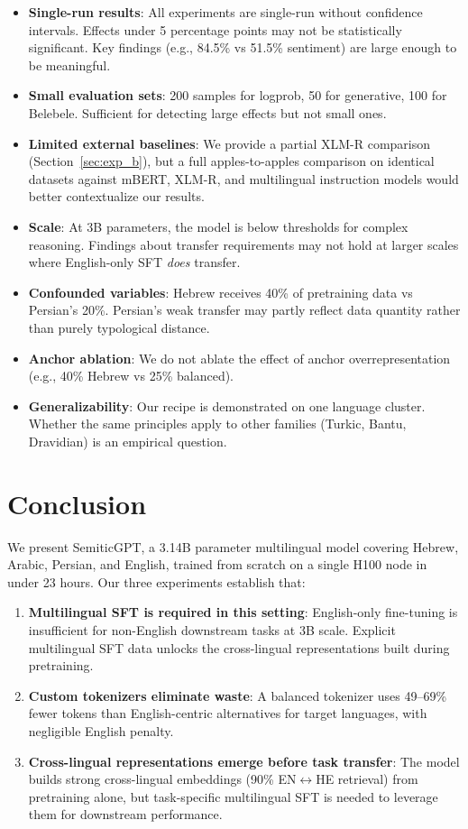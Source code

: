 \documentclass[10pt,twocolumn]{article}
\begin{document}
\begin{itemize}
    \item \textbf{Single-run results}: All experiments are single-run without confidence intervals. Effects under 5 percentage points may not be statistically significant. Key findings (e.g., 84.5\% vs 51.5\% sentiment) are large enough to be meaningful.
    \item \textbf{Small evaluation sets}: 200 samples for logprob, 50 for generative, 100 for Belebele. Sufficient for detecting large effects but not small ones.
    \item \textbf{Limited external baselines}: We provide a partial XLM-R comparison (Section~\ref{sec:exp_b}), but a full apples-to-apples comparison on identical datasets against mBERT, XLM-R, and multilingual instruction models would better contextualize our results.
    \item \textbf{Scale}: At 3B parameters, the model is below thresholds for complex reasoning. Findings about transfer requirements may not hold at larger scales where English-only SFT \emph{does} transfer.
    \item \textbf{Confounded variables}: Hebrew receives 40\% of pretraining data vs Persian's 20\%. Persian's weak transfer may partly reflect data quantity rather than purely typological distance.
    \item \textbf{Anchor ablation}: We do not ablate the effect of anchor overrepresentation (e.g., 40\% Hebrew vs 25\% balanced).
    \item \textbf{Generalizability}: Our recipe is demonstrated on one language cluster. Whether the same principles apply to other families (Turkic, Bantu, Dravidian) is an empirical question.
\end{itemize}

\section{Conclusion}

We present SemiticGPT, a 3.14B parameter multilingual model covering Hebrew, Arabic, Persian, and English, trained from scratch on a single H100 node in under 23 hours. Our three experiments establish that:

\begin{enumerate}
    \item \textbf{Multilingual SFT is required in this setting}: English-only fine-tuning is insufficient for non-English downstream tasks at 3B scale. Explicit multilingual SFT data unlocks the cross-lingual representations built during pretraining.
    \item \textbf{Custom tokenizers eliminate waste}: A balanced tokenizer uses 49--69\% fewer tokens than English-centric alternatives for target languages, with negligible English penalty.
    \item \textbf{Cross-lingual representations emerge before task transfer}: The model builds strong cross-lingual embeddings (90\% EN$\leftrightarrow$HE retrieval) from pretraining alone, but task-specific multilingual SFT is needed to leverage them for downstream performance.
\end{enumerate}
\end{document}
